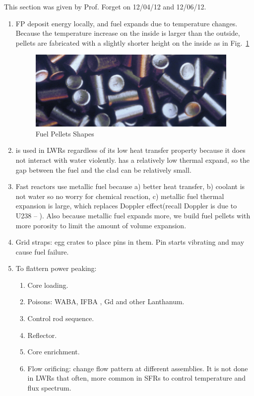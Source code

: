 \documentclass{school-22.211-notes}
\begin{document}
\clearpage
{}
This section was given by Prof. Forget on 12/04/12 and 12/06/12. 
\begin{enumerate}
\item FP deposit energy locally, and fuel expands due to temperature
  changes. Because the temperature increase on the inside is larger
  than the outside, pellets are fabricated with a slightly shorter
  height on the inside as in Fig.~\ref{fuel_pellets}
\begin{figure}[ht]
  \centering
  \includegraphics[width=4in]{images/dfs/fuel_pellets.png}
  \caption{Fuel Pellets Shapes} \label{fuel_pellets}
\end{figure}


\item {} is used in LWRs regardless of its low heat transfer
  property because it does not interact with water
  violently.  has a relatively low thermal expand, so the gap
  between the fuel and the clad can be relatively small.

\item Fast reactors use metallic fuel because a) better heat transfer,
  b) coolant is not water so no worry for chemical reaction, c)
  metallic fuel thermal expansion is large, which replaces Doppler
  effect(recall Doppler is due to U238 -- ). Also because metallic
  fuel expands more, we build fuel pellets with more porosity to limit
  the amount of volume expansion.

\item Grid straps: egg crates to place pins in them. Pin starts
  vibrating and may cause fuel failure.

\item To flattern power peaking: 
  \begin{enumerate}
  \item Core loading. 
  \item Poisons: WABA, IFBA , Gd and other Lanthanum. 
  \item Control rod sequence. 
  \item Reflector. 
  \item Core enrichment. 
  \item Flow orificing: change flow pattern at different
    assemblies. It is not done in LWRs that often, more common in SFRs
    to control temperature and flux spectrum.
  \end{enumerate}


\end{enumerate}
\end{document}
